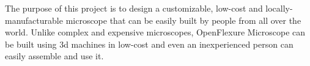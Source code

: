 The purpose of this project is to design a customizable, low-cost and locally-manufacturable \cite{local} microscope that can be easily built by people from all over the world. Unlike complex and expensive microscopes, OpenFlexure Microscope can be built using 3d machines in low-cost and even an inexperienced person can easily assemble and use it.